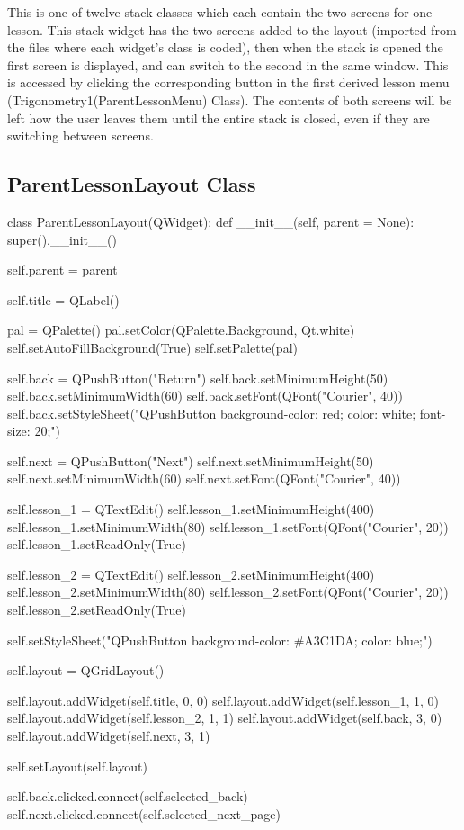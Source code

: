 This is one of twelve stack classes which each contain the two screens for one lesson. This stack widget has the two screens added to the layout (imported from the files where each widget's class is coded), then when the stack is opened the first screen is displayed, and can switch to the second in the same window. This is accessed by clicking the corresponding button in the first derived lesson menu (Trigonometry1(ParentLessonMenu) Class). The contents of both screens will be left how the user leaves them until the entire stack is closed, even if they are switching between screens.

\subsection{ParentLessonLayout Class}

\begin{python}
class ParentLessonLayout(QWidget):
    def __init__(self, parent = None):
        super().__init__()
   
        self.parent = parent

        self.title = QLabel()

        pal = QPalette()
        pal.setColor(QPalette.Background, Qt.white)
        self.setAutoFillBackground(True)
        self.setPalette(pal)

        self.back = QPushButton("Return")
        self.back.setMinimumHeight(50)
        self.back.setMinimumWidth(60)
        self.back.setFont(QFont("Courier", 40))
        self.back.setStyleSheet("QPushButton {background-color: red; color: white; font-size: 20;}")
        
        self.next = QPushButton("Next")
        self.next.setMinimumHeight(50)
        self.next.setMinimumWidth(60)
        self.next.setFont(QFont("Courier", 40))

        self.lesson_1 = QTextEdit()
        self.lesson_1.setMinimumHeight(400)
        self.lesson_1.setMinimumWidth(80)
        self.lesson_1.setFont(QFont("Courier", 20))
        self.lesson_1.setReadOnly(True)
        
        self.lesson_2 = QTextEdit()
        self.lesson_2.setMinimumHeight(400)
        self.lesson_2.setMinimumWidth(80)
        self.lesson_2.setFont(QFont("Courier", 20))
        self.lesson_2.setReadOnly(True)

        self.setStyleSheet("QPushButton {background-color: #A3C1DA; color: blue;}")

        self.layout = QGridLayout()

        self.layout.addWidget(self.title, 0, 0) 
        self.layout.addWidget(self.lesson_1, 1, 0)
        self.layout.addWidget(self.lesson_2, 1, 1)
        self.layout.addWidget(self.back, 3, 0)
        self.layout.addWidget(self.next, 3, 1)

        self.setLayout(self.layout)

        self.back.clicked.connect(self.selected_back)
        self.next.clicked.connect(self.selected_next_page)
\end{python}

